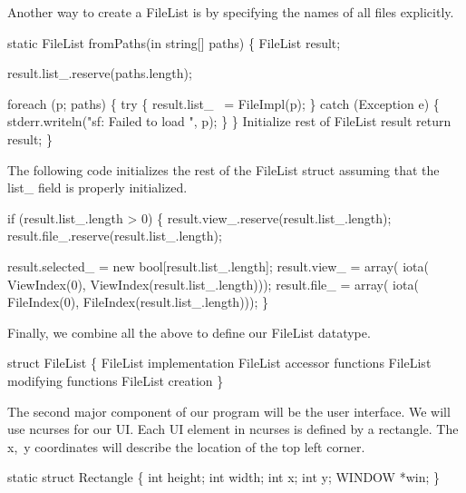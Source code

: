 \nwendcode{}Another way to create a {\Tt{}FileList\nwendquote} is by specifying the names of
all files explicitly.

\nwenddocs{}\plusendmoddef\nwstartdeflinemarkup\nwenddeflinemarkup
static FileList fromPaths(in string[] paths)
\{
  FileList result;

  result.list_.reserve(paths.length);

  foreach (p; paths) \{
    try \{
      result.list_ ~= FileImpl(p);
    \} catch (Exception e) \{
      stderr.writeln("sf: Failed to load ", p);
    \}
  \}
  \LA{}Initialize rest of FileList result\RA{}
  return result;
\}

\nwendcode{}The following code initializes the rest of the {\Tt{}FileList\nwendquote} struct
assuming that the {\Tt{}list{\_}\nwendquote} field is properly initialized.

\nwenddocs{}\endmoddef\nwstartdeflinemarkup\nwenddeflinemarkup
if (result.list_.length > 0) \{
  result.view_.reserve(result.list_.length);
  result.file_.reserve(result.list_.length);

  result.selected_ = new bool[result.list_.length];
  result.view_     = array(
                      iota(
                      ViewIndex(0),
                      ViewIndex(result.list_.length)));
  result.file_     = array(
                      iota(
                       FileIndex(0),
                       FileIndex(result.list_.length)));
\}

\nwendcode{}Finally, we combine all the above to define our {\Tt{}FileList\nwendquote}
datatype.

\nwenddocs{}\endmoddef\nwstartdeflinemarkup\nwenddeflinemarkup
struct FileList
\{
  \LA{}FileList implementation\RA{}
  \LA{}FileList accessor functions\RA{}
  \LA{}FileList modifying functions\RA{}
  \LA{}FileList creation\RA{}
\}

\nwendcode{}The second major component of our program will be the user
interface. We will use ncurses for our UI. Each UI element in ncurses
is defined by a rectangle. The {\Tt{}x,\ y\nwendquote} coordinates will describe the
location of the top left corner.

\nwenddocs{}\endmoddef\nwstartdeflinemarkup\nwenddeflinemarkup
static struct Rectangle \{
  int height;
  int width;
  int x;
  int y;
  WINDOW *win;
\}

